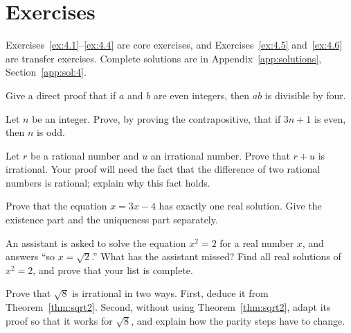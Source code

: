 \section*{Exercises}
Exercises~\ref{ex:4.1}--\ref{ex:4.4} are core exercises, and Exercises~\ref{ex:4.5} and~\ref{ex:4.6} are transfer exercises. Complete solutions are in Appendix~\ref{app:solutions}, Section~\ref{app:sol:4}.
\begin{exercise}\label{ex:4.1}Give a direct proof that if $a$ and $b$ are even integers, then $ab$ is divisible by four.\end{exercise}
\begin{exercise}\label{ex:4.2}Let $n$ be an integer. Prove, by proving the contrapositive, that if $3n+1$ is even, then $n$ is odd.\end{exercise}
\begin{exercise}\label{ex:4.3}Let $r$ be a rational number and $u$ an irrational number. Prove that $r+u$ is irrational. Your proof will need the fact that the difference of two rational numbers is rational; explain why this fact holds.\end{exercise}
\begin{exercise}\label{ex:4.4}Prove that the equation $x=3x-4$ has exactly one real solution. Give the existence part and the uniqueness part separately.\end{exercise}
\begin{exercise}\label{ex:4.5}An assistant is asked to solve the equation $x^2=2$ for a real number $x$, and answers ``so $x=\sqrt2$.'' What has the assistant missed? Find all real solutions of $x^2=2$, and prove that your list is complete.\end{exercise}
\begin{exercise}\label{ex:4.6}Prove that $\sqrt8$ is irrational in two ways. First, deduce it from Theorem~\ref{thm:sqrt2}. Second, without using Theorem~\ref{thm:sqrt2}, adapt its proof so that it works for $\sqrt8$, and explain how the parity steps have to change.\end{exercise}
